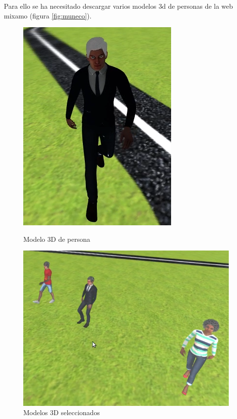 Para ello se ha necesitado descargar varios modelos 3d de personas de la web mixamo \cite{mixamo} (figura \ref{fig:muneco}).
\begin{figure}[!htb]
    \includegraphics[width=\linewidth]{figures/simulado/muneco.png}
    \caption{Modelo 3D de persona}\label{fig:muneco}
\endminipage\hfill
{}
    \includegraphics[width=\linewidth]{figures/simulado/persons.png}
    \caption{Modelos 3D seleccionados}\label{fig:persons}
\endminipage\hfill
\end{figure}

